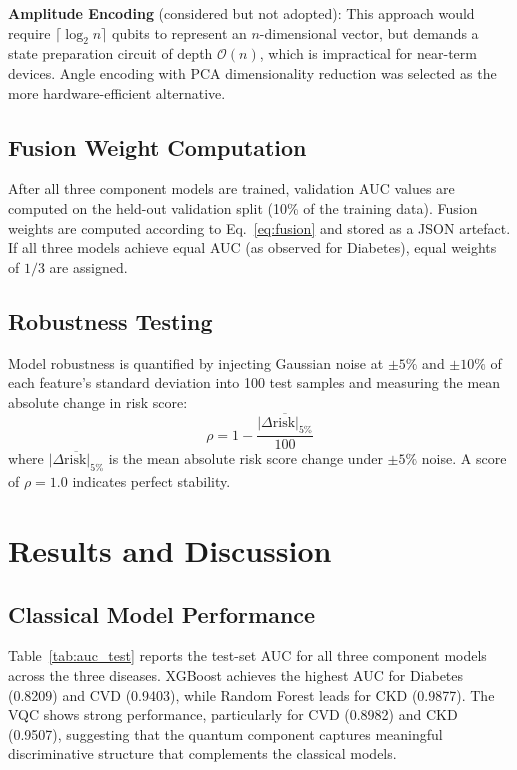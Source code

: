 ﻿\documentclass[conference]{IEEEtran}
\begin{document}
\textbf{Amplitude Encoding} (considered but not adopted): This approach would require
$\lceil \log_2 n \rceil$ qubits to represent an $n$-dimensional vector, but demands a
state preparation circuit of depth $\mathcal{O}(n)$, which is impractical for near-term
devices. Angle encoding with PCA dimensionality reduction was selected as the more
hardware-efficient alternative.

\subsection{Fusion Weight Computation}

After all three component models are trained, validation AUC values are computed on the
held-out validation split (10\% of the training data). Fusion weights are computed
according to Eq.~\ref{eq:fusion} and stored as a JSON artefact. If all three models
achieve equal AUC (as observed for Diabetes), equal weights of $1/3$ are assigned.

\subsection{Robustness Testing}

Model robustness is quantified by injecting Gaussian noise at $\pm 5\%$ and $\pm 10\%$
of each feature's standard deviation into 100 test samples and measuring the mean
absolute change in risk score:
\begin{equation}
    \rho = 1 - \frac{\overline{|\Delta \text{risk}|_{5\%}}}{100}
    \label{eq:robustness}
\end{equation}
where $\overline{|\Delta \text{risk}|_{5\%}}$ is the mean absolute risk score change
under $\pm 5\%$ noise. A score of $\rho = 1.0$ indicates perfect stability.

\section{Results and Discussion}
\label{sec:results}

\subsection{Classical Model Performance}

Table~\ref{tab:auc_test} reports the test-set AUC for all three component models across
the three diseases. XGBoost achieves the highest AUC for Diabetes (0.8209) and CVD
(0.9403), while Random Forest leads for CKD (0.9877). The VQC shows strong performance,
particularly for CVD (0.8982) and CKD (0.9507), suggesting that the quantum component
captures meaningful discriminative structure that complements the classical models.
\end{document}
